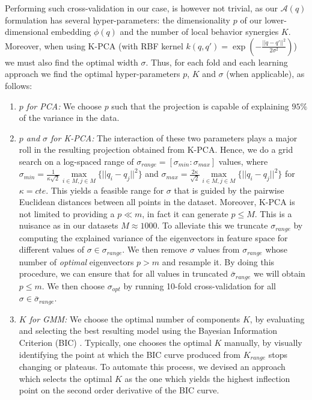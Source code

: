 \documentclass[letterpaper, 10 pt, conference,fleqn]{ieeeconf}
\begin{document}
Performing such cross-validation in our case, is however not trivial, as our $\mathcal{A}(q)$ formulation has several hyper-parameters: the dimensionality $p$ of our lower-dimensional embedding $\phi(q)$ and the number of local behavior synergies $K$. Moreover, when using K-PCA (with RBF kernel $k(q,q') = \exp(-\frac{||q-q'||^2}{2\sigma^2})$) we must also find the optimal width $\sigma$. Thus, for each fold and each learning approach we find the optimal hyper-parameters $p$, $K$ and $\sigma$ (when applicable), as follows:
\begin{enumerate}[leftmargin=*]
\item \textit{$p$ for PCA:} We choose $p$ such that the projection is capable of explaining $95\%$ of the variance in the data.
\item \textit{$p$ and $\sigma$ for K-PCA:} The interaction of these two parameters plays a major roll in the resulting projection obtained from K-PCA. Hence, we do a grid search on a log-spaced range of $\sigma_{range} = [\sigma_{min}:\sigma_{max}]$ values, where 
$\sigma_{min} = \frac{1}{\kappa\sqrt{2}} \underset{i \in M,j\in M}{\max}\{||q_i - q_j||^2\}$ and $\sigma_{max} = \frac{2\kappa}{\sqrt{2}} \underset{i \in M,j\in M}{\max}\{||q_i - q_j||^2\}$ for $\kappa = cte.$ This yields a feasible range for $\sigma$ that is guided by the pairwise Euclidean distances between all points in the dataset. Moreover, K-PCA is not limited to providing a $p \ll m$, in fact it can generate $p \le M$. This is a nuisance as in our datasets $M\approx1000$. To alleviate this we truncate $\sigma_{range}$ by computing the explained variance of the eigenvectors in feature space for different values of  $\sigma \in \sigma_{range}$. We then remove $\sigma$ values from $\sigma_{range}$ whose number of \textit{optimal} eigenvectors $p > m$ and resample it. By doing this procedure, we can ensure that for all values in truncated $\bar{\sigma}_{range}$ we will obtain $p \le m$. We then choose $\sigma_{opt}$ by running 10-fold cross-validation for all $\sigma \in \bar{\sigma}_{range}$. 
\item \textit{$K$ for GMM:} We choose the optimal number of components $K$, by evaluating and selecting the best resulting model using the Bayesian Information Criterion (BIC) \cite{Bishop:PRM:2006}. Typically, one chooses the optimal $K$ manually, by visually identifying the point at which the BIC curve produced from $K_{range}$ stops changing or plateaus. To automate this process, we devised an approach which selects the optimal $K$ as the one which yields the highest inflection point on the second order derivative of the BIC curve.
\end{enumerate}
\end{document}
